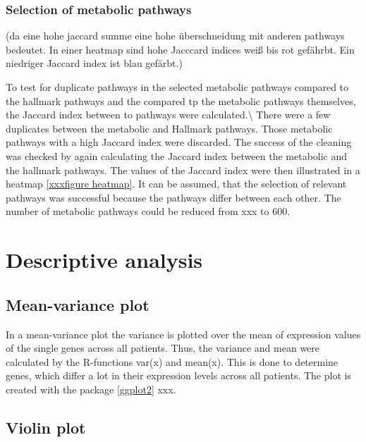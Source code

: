 \documentclass[
  parskip,
  oneside]{scrreprt}
\begin{document}
\hypertarget{selection-of-metabolic-pathways}{%
\subsubsection{Selection of metabolic
pathways}\label{selection-of-metabolic-pathways}}

(da eine hohe jaccard summe eine hohe überschneidung mit anderen
pathways bedeutet. In einer heatmap sind hohe Jacccard indices weiß bis
rot gefährbt. Ein niedriger Jaccard index ist blau gefärbt.)

To test for duplicate pathways in the selected metabolic pathways
compared to the hallmark pathways and the compared tp the metabolic
pathways themselves, the Jaccard index between to pathways were
calculated.\textbackslash{} There were a few duplicates between the
metabolic and Hallmark pathways. Those metabolic pathways with a high
Jaccard index were discarded. The success of the cleaning was checked by
again calculating the Jaccard index between the metabolic and the
hallmark pathways. The values of the Jaccard index were then illustrated
in a heatmap \ref{xxxfigure heatmap}. It can be assumed, that the
selection of relevant pathways was successful because the pathways
differ between each other. The number of metabolic pathways could be
reduced from xxx to 600.

\hypertarget{descriptive-analysis}{%
\section{Descriptive analysis}\label{descriptive-analysis}}

\hypertarget{mean-variance-plot}{%
\subsection{Mean-variance plot}\label{mean-variance-plot}}

In a mean-variance plot the variance is plotted over the mean of
expression values of the single genes across all patients. Thus, the
variance and mean were calculated by the R-functions var(x) and mean(x).
This is done to determine genes, which differ a lot in their expression
levels across all patients. The plot is created with the package
\ref{ggplot2} xxx.

\hypertarget{violin-plot}{%
\subsection{Violin plot}\label{violin-plot}}
\end{document}
